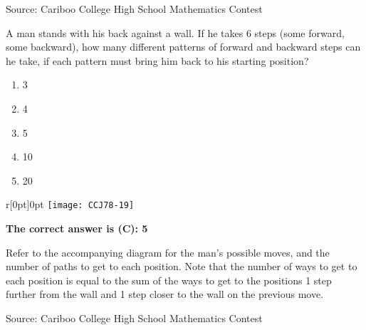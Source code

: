 \documentclass{article}
\begin{document}
\vskip 1.5cm


\scriptsize
Source: Cariboo College High School Mathematics Contest

\normalsize
A man stands with his back against a wall. If he takes 6 steps (some forward, some backward), how many different patterns of forward and backward steps can he take, if each pattern must bring him back to his starting position?
\begin{enumerate}[noitemsep,topsep=0mm,leftmargin=*,widest=D,label=\Alph*)]
	\item 3
	\item 4
	\item 5
	\item 10
	\item 20
\end{enumerate}

\begin{wrapfigure}{r}[0pt]{0pt}
	\texttt{[image: CCJ78-19]}
\end{wrapfigure}
\textbf{The correct answer is (C): 5}

Refer to the accompanying diagram for the man's possible moves, and the number of paths to get to each position. Note that the number of ways to get to each position is equal to the sum of the ways to get to the positions 1 step further from the wall and 1 step closer to the wall on the previous move.

\vskip 1.5cm


\scriptsize
Source: Cariboo College High School Mathematics Contest

\normalsize
\end{document}
